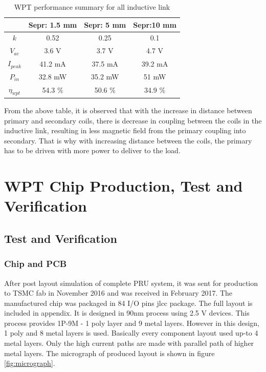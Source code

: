 \documentclass[12pt,a4paper,UKenglish]{report}
\begin{document}
\begin{table}[H]
\caption{WPT performance summary for all inductive link} 
\begin{center}
\begin{tabular}{c|c|c|c}
\hline \hline
				& \textbf{Sepr: 1.5 mm}	& \textbf{Sepr: 5 mm} 	& \textbf{Sepr:10 mm} \\ \hline \hline
$ k $				& 0.52						& 0.25		& 0.1		\\ \hline
$V_{ac}$			& 3.6 \si{\volt}		& 3.7 \si{\volt} 		& 4.7 \si{\volt}	\\ \hline
$I_{peak}$			& 41.2 \si{\milli\ampere}	& 37.5 \si{\milli\ampere} 	& 39.2 \si{\milli\ampere} \\ \hline
$P_{in}$			& 32.8 \si{\milli\watt}	& 35.2 \si{\milli\watt} 	& 51 \si{\milli\watt} \\ \hline
$\eta_{wpt}$			& 54.3 \%		& 50.6 \%			& 34.9 \% \\ 
 
\hline \hline
\end{tabular}
\end{center}
\label{tab:wpt_spec_all}
\end{table}%

From the above table, it is observed that with the increase in distance between primary and secondary coils, there is decrease in coupling 
between the coils in the inductive link, resulting in less magnetic field from the primary coupling into secondary. That is why with increasing 
distance between the coils, the primary has to be driven with more power to deliver to the load.

\part{WPT Chip Production, Test and Verification } 
\chapter{Test and Verification }  %

\section{Chip and PCB}
After post layout simulation of complete PRU system, it was sent for production to TSMC fab in November 2016 and was received in February 2017. The  manufactured chip was packaged in 84 I/O pins \acrshort{jlcc} package. The full layout is included in appendix. It is designed in 90nm process using 2.5 V devices. This process provides 1P-9M - 1 poly layer and 9 metal layers. However in this design, 1 poly and 8 metal layers is used. Basically every component layout used up-to 4 metal layers. Only the high current paths are made with parallel path of higher metal layers. The micrograph of produced layout is shown in figure \ref{fig:micrograph}.\\
\end{document}
